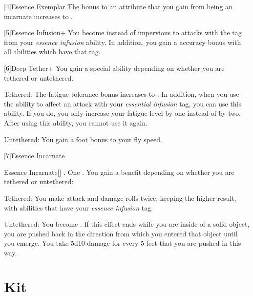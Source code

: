     [4]{Essence Exemplar} The bonus to an attribute that you gain from being an incarnate increases to .

    [5]{Essence Infusion+} You become  instead of impervious to attacks with the tag from your \textit{essence infusion} ability.
    In addition, you gain a  accuracy bonus with all abilities which have that tag.

    [6]{Deep Tether+} You gain a special ability depending on whether you are tethered or untethered.
      \begin{raggeditemize}
        \item Tethered: The fatigue tolerance bonus increases to .
          In addition, when you use the  ability to affect an attack with your \textit{essential infusion} tag, you can use this ability.
          If you do, you only increase your fatigue level by one instead of by two.
          After using this ability, you  cannot use it again.
        \item Untethered: You gain a  foot bonus to your fly speed.
      \end{raggeditemize}

    [7]{Essence Incarnate}
      \begin{magicalactiveability}{Essence Incarnate}[]
        \abilityusagetime {}.
        \abilitycost One .
        \rankline
        You gain a benefit depending on whether you are tethered or untethered:
        \begin{raggeditemize}
          \item Tethered: You  make attack and damage rolls twice, keeping the higher result, with abilities that have your \textit{essence infusion} tag.
          \item Untethered: You  become .
            If this effect ends while you are inside of a solid object, you are pushed back in the direction from which you entered that object until you emerge.
            You take 5d10 damage for every 5 feet that you are pushed in this way.
        \end{raggeditemize}

        {}
      \end{magicalactiveability}

\section{Kit}

